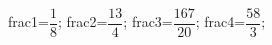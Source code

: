 \documentclass[exercice]{thedocument}%
\begin{document}
%
    \>frac1=$\dfrac18$;%
    \>frac2=$\dfrac{13}4$;%
    \>frac3=$\dfrac{167}{20}$;%
    \>frac4=$\dfrac{58}3$;%
\end{document}
